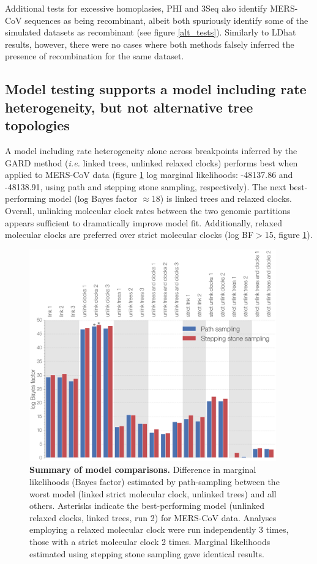 \documentclass[11pt,oneside,letterpaper]{article}
\begin{document}
Additional tests for excessive homoplasies, PHI and 3Seq also identify MERS-CoV sequences as being recombinant, albeit both spuriously identify some of the simulated datasets as recombinant (see figure \ref{alt_tests}).
Similarly to LDhat results, however, there were no cases where both methods falsely inferred the presence of recombination for the same dataset.

\subsection*{Model testing supports a model including rate heterogeneity, but not alternative tree topologies}
A model including rate heterogeneity alone across breakpoints inferred by the GARD method (\textit{i.e.} linked trees, unlinked relaxed clocks) performs best when applied to MERS-CoV data (figure \ref{marginal} log marginal likelihoods: -48137.86 and -48138.91, using path and stepping stone sampling, respectively).
The next best-performing model (log Bayes factor $\approx$18) is linked trees and relaxed clocks.
Overall, unlinking molecular clock rates between the two genomic partitions appears sufficient to dramatically improve model fit.
Additionally, relaxed molecular clocks are preferred over strict molecular clocks (log BF$>$15, figure \ref{marginal}).

\begin{figure}[h!]
	\centering
	\includegraphics[width=0.95\textwidth]{figures/MERS_marginal_likelihoods.png}
	\caption{\textbf{Summary of model comparisons.}
Difference in marginal likelihoods (Bayes factor) estimated by path-sampling between the worst model (linked strict molecular clock, unlinked trees) and all others.
Asterisks indicate the best-performing model (unlinked relaxed clocks, linked trees, run 2) for MERS-CoV data.
Analyses employing a relaxed molecular clock were run independently 3 times, those with a strict molecular clock 2 times.
Marginal likelihoods estimated using stepping stone sampling gave identical results.}
	\label{marginal}
\end{figure}
\end{document}
